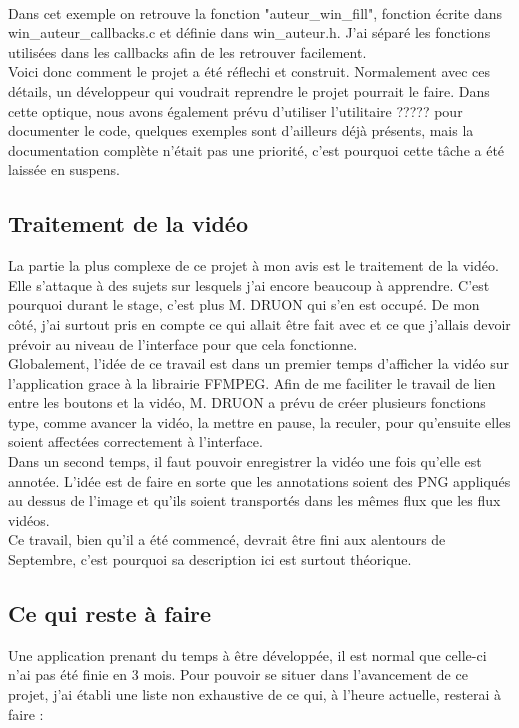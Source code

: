 \documentclass[11pt,french,a4paper]{report}
\begin{document}
\\
Dans cet exemple on retrouve la fonction "auteur\_win\_fill", fonction écrite dans win\_auteur\_callbacks.c et définie
dans win\_auteur.h. J'ai séparé les fonctions utilisées dans les callbacks afin de les retrouver facilement. \\

Voici donc comment le projet a été réflechi et construit. Normalement avec ces détails, un développeur qui voudrait reprendre
le projet pourrait le faire. Dans cette optique, nous avons également prévu d'utiliser %
l'utilitaire ????? pour documenter le code, quelques exemples sont d'ailleurs déjà présents, mais la documentation 
complète n'était pas une priorité, c'est pourquoi cette tâche a été laissée en suspens. 
       
        \subsection{Traitement de la vidéo}
La partie la plus complexe de ce projet à mon avis est le traitement de la vidéo. Elle s'attaque à des sujets sur lesquels j'ai 
encore beaucoup à apprendre. C'est pourquoi durant le stage, c'est plus M. DRUON qui s'en est occupé. De mon côté, j'ai surtout
pris en compte ce qui allait être fait avec et ce que j'allais devoir prévoir au niveau de l'interface pour que cela fonctionne. \\

Globalement, l'idée de ce travail est dans un premier temps d'afficher la vidéo sur l'application grace à 
la librairie FFMPEG. Afin de me faciliter
le travail de lien entre les boutons et la vidéo, M. DRUON a prévu de créer plusieurs fonctions type, comme avancer la vidéo, la 
mettre en pause, la reculer, pour qu'ensuite elles soient affectées correctement à l'interface. \\

Dans un second temps, il faut pouvoir enregistrer la vidéo une fois qu'elle est annotée. L'idée est de faire en sorte que les annotations
soient des PNG appliqués au dessus de l'image et qu'ils soient transportés dans les mêmes flux que les flux vidéos. \\

Ce travail, bien qu'il a été commencé, devrait être fini aux alentours de Septembre, c'est pourquoi sa description ici
est surtout théorique. \\


        \subsection{Ce qui reste à faire}
Une application prenant du temps à être développée, il est normal que celle-ci n'ai pas été finie en 3 mois. Pour pouvoir se situer
dans l'avancement de ce projet, j'ai établi une liste non exhaustive de ce qui, à l'heure actuelle, resterai à faire : \\ 
\end{document}
